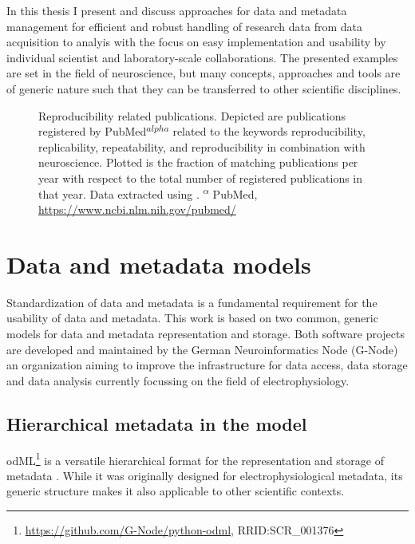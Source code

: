 In this thesis I present and discuss approaches for data and metadata management for efficient and robust handling of research data from data acquisition to analyis with the focus on easy implementation and usability by individual scientist and laboratory-scale collaborations. The presented examples are set in the field of neuroscience, but many concepts, approaches and tools are of generic nature such that they can be transferred to other scientific disciplines. 


\begin{figure}
 \centering
 
 \caption[Reproducibility related publications]{Reproducibility related publications. Depicted  are publications registered by PubMed\textsuperscript{$alpha$} related to the keywords reproducibility, replicability, repeatability, and reproducibility in combination with neuroscience. Plotted is the fraction of matching publications per year with respect to the total number of registered publications in that year. Data extracted using \citet{Corlan_2004}. \small\textsuperscript{$\alpha$} PubMed, \url{https://www.ncbi.nlm.nih.gov/pubmed/}}
 \label{fig:intro_reproducibility}
\end{figure}

\section{Data and metadata models}
Standardization of data and metadata is a fundamental requirement for the usability of data and metadata. This work is based on two common, generic models for data and metadata representation and storage. Both software projects are developed and maintained by the German Neuroinformatics Node (G-Node) an organization aiming to improve the infrastructure for data access, data storage and data analysis currently focussing on the field of electrophysiology.

\subsection{Hierarchical metadata in the  model}
\label{sec:subodML}

odML\footnote{\url{https://github.com/G-Node/python-odml}, RRID:SCR\_001376} is a versatile hierarchical format for the representation and storage of metadata \citep{Grewe_2011}. While it was originally designed for electrophysiological metadata, its generic structure makes it also applicable to other scientific contexts.\\

